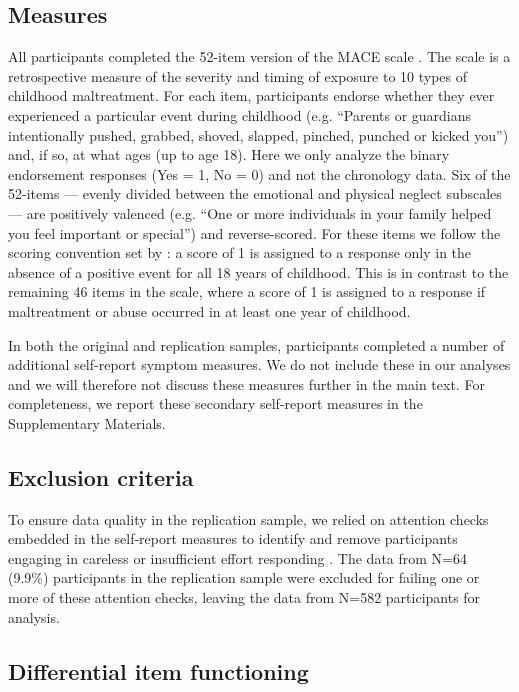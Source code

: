 \documentclass[letterpaper,man,natbib]{apa6}  %
\begin{document}
\subsection{Measures}

All participants completed the 52-item version of the MACE scale \citep{teicher2015maltreatment}. The scale is a retrospective measure of the severity and timing of exposure to 10 types of childhood maltreatment. For each item, participants endorse whether they ever experienced a particular event during childhood (e.g. ``Parents or guardians intentionally pushed, grabbed, shoved, slapped, pinched, punched or kicked you'') and, if so, at what ages (up to age 18). Here we only analyze the binary endorsement responses (Yes = 1, No = 0) and not the chronology data. Six of the 52-items --- evenly divided between the emotional and physical neglect subscales --- are positively valenced (e.g. ``One or more individuals in your family helped you feel important or special'') and reverse-scored. For these items we follow the scoring convention set by \cite{teicher2015maltreatment}: a score of 1 is assigned to a response only in the absence of a positive event for all 18 years of childhood. This is in contrast to the remaining 46 items in the scale, where a score of 1 is assigned to a response if maltreatment or abuse occurred in at least one year of childhood.

In both the original and replication samples, participants completed a number of additional self-report symptom measures. We do not include these in our analyses and we will therefore not discuss these measures further in the main text. For completeness, we report these secondary self-report measures in the Supplementary Materials. 

\subsection{Exclusion criteria}

To ensure data quality in the replication sample, we relied on attention checks embedded in the self-report measures to identify and remove participants engaging in careless or insufficient effort responding \citep{zorowitz2021inattentive}. The data from N=64 (9.9\%)  participants in the replication sample were excluded for failing one or more of these attention checks, leaving the data from N=582 participants for analysis.

\subsection{Differential item functioning}
\end{document}
